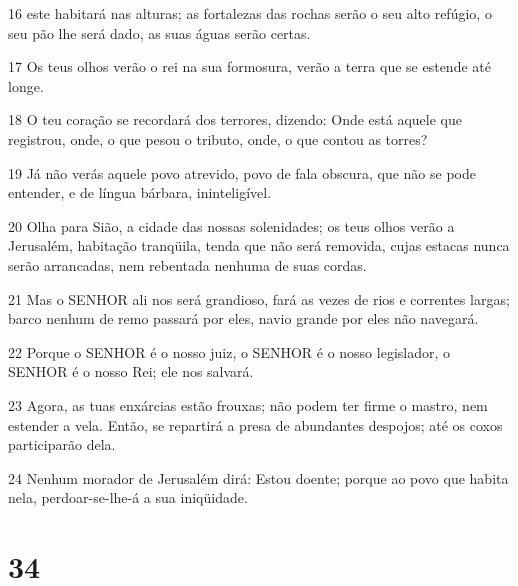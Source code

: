 \par 16 este habitará nas alturas; as fortalezas das rochas serão o seu alto refúgio, o seu pão lhe será dado, as suas águas serão certas.
\par 17 Os teus olhos verão o rei na sua formosura, verão a terra que se estende até longe.
\par 18 O teu coração se recordará dos terrores, dizendo: Onde está aquele que registrou, onde, o que pesou o tributo, onde, o que contou as torres?
\par 19 Já não verás aquele povo atrevido, povo de fala obscura, que não se pode entender, e de língua bárbara, ininteligível.
\par 20 Olha para Sião, a cidade das nossas solenidades; os teus olhos verão a Jerusalém, habitação tranqüila, tenda que não será removida, cujas estacas nunca serão arrancadas, nem rebentada nenhuma de suas cordas.
\par 21 Mas o SENHOR ali nos será grandioso, fará as vezes de rios e correntes largas; barco nenhum de remo passará por eles, navio grande por eles não navegará.
\par 22 Porque o SENHOR é o nosso juiz, o SENHOR é o nosso legislador, o SENHOR é o nosso Rei; ele nos salvará.
\par 23 Agora, as tuas enxárcias estão frouxas; não podem ter firme o mastro, nem estender a vela. Então, se repartirá a presa de abundantes despojos; até os coxos participarão dela.
\par 24 Nenhum morador de Jerusalém dirá: Estou doente; porque ao povo que habita nela, perdoar-se-lhe-á a sua iniqüidade.

\chapter{34}

